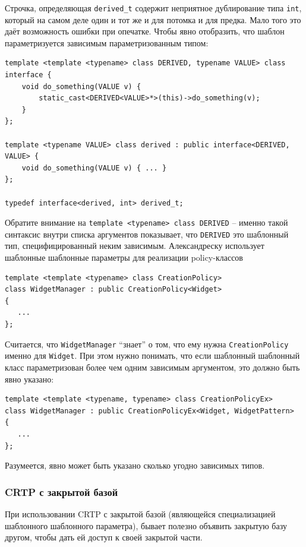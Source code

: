 \documentclass[a4paper,12pt,oneside]{article}
\begin{document}
Строчка, определяющая \lstinline!derived_t! содержит неприятное дублирование типа  \lstinline!int!, который на самом деле один и тот же и для потомка и для предка. Мало того это даёт возможность ошибки при опечатке. Чтобы явно отобразить, что шаблон параметризуется зависимым параметризованным типом:

\begin{lstlisting}
template <template <typename> class DERIVED, typename VALUE> class interface {
    void do_something(VALUE v) {
        static_cast<DERIVED<VALUE>*>(this)->do_something(v);
    }
};

template <typename VALUE> class derived : public interface<DERIVED, VALUE> {
    void do_something(VALUE v) { ... }
};

typedef interface<derived, int> derived_t;
\end{lstlisting}

Обратите внимание на \lstinline!template <typename> class DERIVED! -- именно такой синтаксис внутри списка аргументов показывает, что \lstinline!DERIVED! это шаблонный тип, специфицированный неким зависимым. Александреску\cite{mcpp} использует шаблонные шаблонные параметры для реализации policy-классов

\begin{lstlisting}
template <template <typename> class CreationPolicy>
class WidgetManager : public CreationPolicy<Widget>
{
   ...
};
\end{lstlisting}

Считается, что \lstinline!WidgetManager! ``знает'' о том, что ему нужна \lstinline!CreationPolicy! именно для \lstinline!Widget!. При этом нужно понимать, что если шаблонный шаблонный класс параметризован более чем одним зависимым аргументом, это должно быть явно указано:

\begin{lstlisting}
template <template <typename, typename> class CreationPolicyEx>
class WidgetManager : public CreationPolicyEx<Widget, WidgetPattern>
{
   ...
};
\end{lstlisting}

Разумеется, явно может быть указано сколько угодно зависимых типов.

\subsubsection{CRTP с закрытой базой}

При использовании CRTP с закрытой базой (являющейся специализацией шаблонного шаблонного параметра), бывает полезно объявить закрытую базу другом, чтобы дать ей доступ к своей закрытой части.
\end{document}
